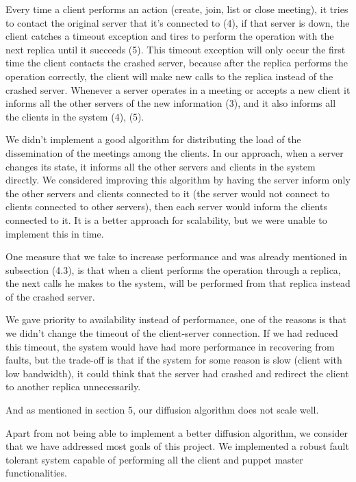 \documentclass[times, 10pt, twocolumn]{article}
\begin{document}

Every time a client performs an action (create, join, list or close meeting), it tries to contact the original server that it's connected to (4), if that server is down, the client catches a timeout exception and tires to perform the operation with the next replica until it succeeds (5). This timeout exception will only occur the first time the client contacts the crashed server, because after the replica performs the operation correctly, the client will make new calls to the replica instead of the crashed server.
Whenever a server operates in a meeting or accepts a new client it informs all the other servers of the new information (3), and it also informs all the clients in the system (4), (5).


We didn't implement a good algorithm for distributing the load of the dissemination of the meetings among the clients. In our approach, when a server changes its state, it informs all the other servers and clients in the system directly. We considered improving this algorithm by having the server inform only the other servers and clients connected to it (the server would not connect to clients connected to other servers), then each server would inform the clients connected to it. It is a better approach for scalability, but we were unable to implement this in time.


One measure that we take to increase performance and was already mentioned in subsection (4.3), is that when a client performs the operation through a replica, the next calls he makes to the system, will be performed from that replica instead of the crashed server.

We gave priority to availability instead of performance, one of the reasons is that we didn't change the timeout of the client-server connection. If we had reduced this timeout, the system would have had more performance in recovering from faults, but the trade-off is that if the system for some reason is slow (client with low bandwidth), it could think that the server had crashed and redirect the client to another replica unnecessarily.

And as mentioned in section 5, our diffusion algorithm does not scale well.


Apart from not being able to implement a better diffusion algorithm, we consider that we have addressed most goals of this project.
We implemented a robust fault tolerant system capable of performing all the client and puppet master functionalities.
\end{document}
